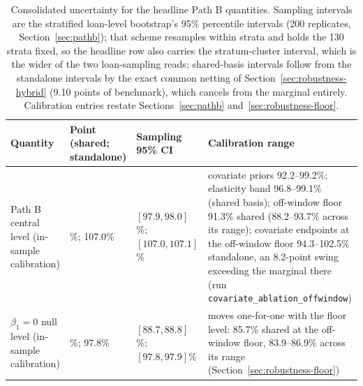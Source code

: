 \documentclass[12pt]{article}
\begin{document}
\begin{table}[!tp]
\centering
\caption{Consolidated uncertainty for the headline Path B quantities. Sampling intervals are the stratified loan-level bootstrap's 95\% percentile intervals (200 replicates, Section~\ref{sec:pathb}); that scheme resamples within strata and holds the 130 strata fixed, so the headline row also carries the stratum-cluster interval, which is the wider of the two loan-sampling reads; shared-basis intervals follow from the standalone intervals by the exact common netting of Section~\ref{sec:robustness-hybrid} (9.10 points of benchmark), which cancels from the marginal entirely. Calibration entries restate Sections~\ref{sec:pathb} and~\ref{sec:robustness-floor}.}
\label{tab:uncertainty}
\footnotesize
\begin{threeparttable}
\setlength{\tabcolsep}{2.5pt}%
\begin{tabular}{@{}>{\raggedright\arraybackslash}p{2.2cm}>{\raggedright\arraybackslash}p{3.0cm}>{\raggedright\arraybackslash}p{3.8cm}>{\raggedright\arraybackslash}p{5.0cm}@{}}
\toprule
Quantity & Point (shared; standalone) & Sampling 95\% CI & Calibration range \\
\midrule
Path B central level (in-sample calibration) & 97.9\%; 107.0\% & $[97.9, 98.0]$\%; $[107.0, 107.1]$\% & covariate priors 92.2--99.2\%; elasticity band 96.8--99.1\% (shared basis); off-window floor 91.3\% shared (88.2--93.7\% across its range); covariate endpoints at the off-window floor 94.3--102.5\% standalone, an 8.2-point swing exceeding the marginal there (run \texttt{covariate\_ablation\_\allowbreak offwindow}) \\
$\beta_1 = 0$ null level (in-sample calibration) & 88.7\%; 97.8\% & $[88.7, 88.8]$\%; $[97.8, 97.9]$\% & moves one-for-one with the floor level: 85.7\% shared at the off-window floor, 83.9--86.9\% across its range (Section~\ref{sec:robustness-floor}) \\

\end{tabular}
\end{threeparttable}
\end{table}
\end{document}
